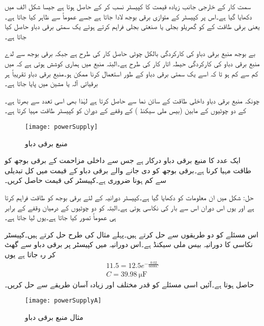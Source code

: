 سمت کار کے خارجی جانب زیادہ قیمت کا کپیسٹر نسب کر کے   حاصل ہوتا ہے جیسا شکل  الف میں دکھایا گیا ہے۔اس پر کپیسٹر کے متوازی برقی بوجھ لادا جاتا ہے جسے عموماً  سے ظاہر کیا جاتا ہے۔ یعنی برقی طاقت کے  کو  گھریلو بجلی یا صنعتی بجلی فراہم کرتے ہوئے یک سمتی برقی دباو  حاصل کیا جاتا ہے۔
 
بے بوجھ منبع برقی دباو کی کارکردگی بالکل چوٹی حاصل کار کی طرح ہے جبکہ برقی بوجھ سے لدے منبع برقی دباو کی کارکردگی حیطہ اتار کار کی طرح ہے۔البتہ منبع میں ہماری کوشش ہوتی ہے کہ   میں  کم سے کم ہو تا کہ اسے یک سمتی برقی دباو کے طور استعمال کرنا ممکن ہو۔منبع برقی دباو تقریباً ہر برقیاتی آلہ یا مشین میں پایا جاتا ہے۔

چونکہ منبع برقی دباو داخلی طاقت  کے سائن نما  سے حاصل کرتا ہے لہٰذا  بھی اسی تعدد سے بھرتا ہے۔ کے دو چوٹیوں کے مابین   (بیس ملی سیکنڈ )  کے وقفے  کے دوران  کو کپیسٹر  طاقت مہیا کرتا ہے۔
\begin{figure}
\centering
\texttt{[image: powerSupply]}
\caption{منبع برقی دباو}
\label{شکل_پاور_منبع}
\end{figure}
 
ایک عدد  کا منبع برقی دباو درکار ہے جس سے  داخلی مزاحمت کے برقی بوجھ کو طاقت مہیا کرنا ہے۔برقی بوجھ کو دی جانے والے برقی دباو کے قیمت میں کل تبدیلی  سے کم ہونا ضروری ہے۔کپیسٹر  کی قیمت حاصل کریں۔

حل: 
شکل  میں ان معلومات کو دکھایا گیا ہے۔کپیسٹر  دورانیہ کے لئے  برقی بوجھ کو طاقت فراہم کرتا ہے اور یوں اس دوران اس سے بار کی نکاسی ہوتی ہے۔البتہ  کو دو چوٹیوں کے درمیان وقفے کے برابر ہی عموماً تصور کیا جاتا ہے۔یوں  لیا جاتا ہے۔

اس مسئلے کو دو طریقوں سے حل کرتے ہیں۔پہلے مثال  کی طرح حل کرتے ہیں۔کپیسٹر نکاسی  کا دورانیہ بیس ملی سیکنڈ ہے۔اس دورانیہ میں  کپیسٹر پر  برقی دباو  سے گھٹ کر  رہ جاتا ہے یوں
\begin{align*}
11.5=12.5 e^{-\frac{0.02}{6000C}}\\
C=\SI{39.98}{\micro \farad}
\end{align*}
حاصل ہوتا ہے۔آئیں اسی مسئلے کو قدر مختلف اور زیادہ آسان طریقے سے حل کریں۔
% 
 \begin{figure}
\centering
\texttt{[image: powerSupplyA]}
\caption{مثال منبع برقی دباو}
\label{شکل_مثال_پاور_منبع}
\end{figure}


